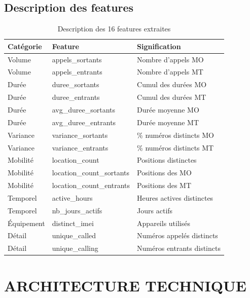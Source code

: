 \documentclass[12pt, oneside, a4paper]{report}
\begin{document}
\subsection{Description des features}
\begin{table}[H]
\centering
\caption{Description des 16 features extraites}
\label{tab:features}
\vspace{0.5cm}
\small
\renewcommand{\arraystretch}{1.3}
\begin{tabular}{|l|l|p{6cm}|}
\hline
\textbf{Catégorie} & \textbf{Feature} & \textbf{Signification} \\
\hline
Volume & appels\_sortants & Nombre d'appels MO \\
\hline
Volume & appels\_entrants & Nombre d'appels MT \\
\hline
Durée & duree\_sortants & Cumul des durées MO \\
\hline
Durée & duree\_entrants & Cumul des durées MT \\
\hline
Durée & avg\_duree\_sortants & Durée moyenne MO \\
\hline
Durée & avg\_duree\_entrants & Durée moyenne MT \\
\hline
Variance & variance\_sortants & \% numéros distincts MO \\
\hline
Variance & variance\_entrants & \% numéros distincts MT \\
\hline
Mobilité & location\_count & Positions distinctes \\
\hline
Mobilité & location\_count\_sortants & Positions des MO \\
\hline
Mobilité & location\_count\_entrants & Positions des MT \\
\hline
Temporel & active\_hours & Heures actives distinctes \\
\hline
Temporel & nb\_jours\_actifs & Jours actifs \\
\hline
Équipement & distinct\_imei & Appareils utilisés \\
\hline
Détail & unique\_called & Numéros appelés distincts \\
\hline
Détail & unique\_calling & Numéros entrants distincts \\
\hline
\end{tabular}
\end{table}

\section{ARCHITECTURE TECHNIQUE}
\end{document}
